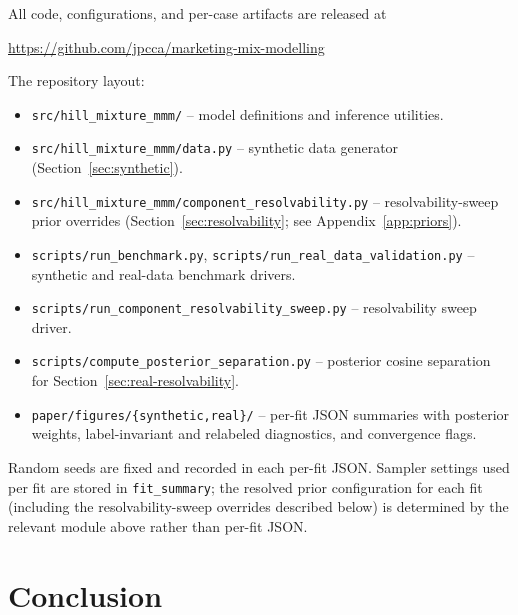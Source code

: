 \documentclass[11pt]{article}
\begin{document}
All code, configurations, and per-case artifacts are released at
\begin{center}
\url{https://github.com/jpcca/marketing-mix-modelling}
\end{center}
The repository layout:
\begin{itemize}
    \item \texttt{src/hill\_mixture\_mmm/} -- model definitions and inference utilities.
    \item \texttt{src/hill\_mixture\_mmm/data.py} -- synthetic data generator (Section~\ref{sec:synthetic}).
    \item \texttt{src/hill\_mixture\_mmm/component\_resolvability.py} -- resolvability-sweep prior overrides (Section~\ref{sec:resolvability}; see Appendix~\ref{app:priors}).
    \item \texttt{scripts/run\_benchmark.py}, \texttt{scripts/run\_real\_data\_validation.py} -- synthetic and real-data benchmark drivers.
    \item \texttt{scripts/run\_component\_resolvability\_sweep.py} -- resolvability sweep driver.
    \item \texttt{scripts/compute\_posterior\_separation.py} -- posterior cosine separation for Section~\ref{sec:real-resolvability}.
    \item \texttt{paper/figures/\{synthetic,real\}/} -- per-fit JSON summaries with posterior weights, label-invariant and relabeled diagnostics, and convergence flags.
\end{itemize}
Random seeds are fixed and recorded in each per-fit JSON. Sampler settings used per fit are stored in \texttt{fit\_summary}; the resolved prior configuration for each fit (including the resolvability-sweep overrides described below) is determined by the relevant module above rather than per-fit JSON.

\section{Conclusion}
\label{sec:conclusion}
\end{document}
